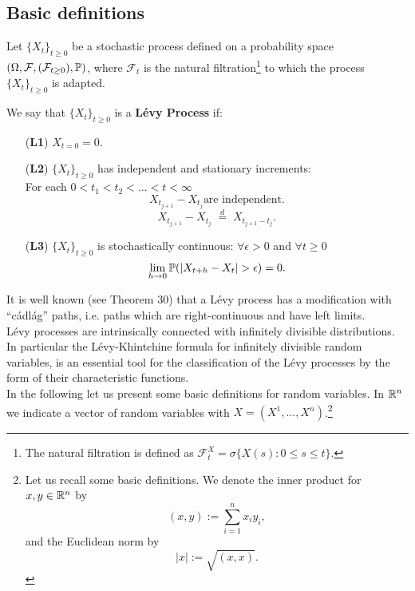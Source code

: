 \subsection{Basic definitions}

Let $\{X_t\}_{t \ge 0}$ be a stochastic process defined on a probability space $(\Omega,\mathcal{F},(\mathcal{F}_{t \ge 0}),\mathbb{P})$, 
where $\mathcal{F}_t$ is the natural filtration\footnote{The natural filtration is defined as $\mathcal{F}_{t}^X = \sigma\{X(s) :
0\leq s \leq t\} $.} to which the process $\{X_t\}_{t \ge 0}$ is adapted.\\ 
\begin{Definition}\label{LevyDef}
We say that $\{X_t\}_{t \ge 0}$ is a \textbf{Lévy Process} if:
\begin{itemize}
 \item[(\textbf{L1})] $X_{t=0} = 0$.
 \item[(\textbf{L2})] $\{X_t\}_{t \ge 0}$ has independent and stationary increments:\\ For each $0<t_1<t_2 <... <t<\infty$
   $$ X_{t_{j+1}} - X_{t_j} \mbox{are independent.} $$
   $$ X_{t_{j+1}} - X_{t_j} \; \overset{d}{=} \; X_{t_{j+1}- t_{j} }. $$ 
 \item[(\textbf{L3})] $\{X_t\}_{t \ge 0}$ is stochastically continuous: $\forall \epsilon > 0 $ and $\forall t \ge 0$  $$\lim_{h\to 0} \mathbb{P}(|X_{t+h}-X_t| > \epsilon)=0. $$ 
\end{itemize}
\end{Definition}
It is well known (see \cite{Protter} Theorem 30) that a Lévy process has a modification with ``cádlág''
paths, i.e. paths which are right-continuous and have left limits. \\
Lévy processes are intrinsically connected with infinitely divisible distributions. In particular the Lévy-Khintchine formula 
for infinitely divisible random variables, is an essential tool for the classification of the Lévy processes by the form of their
characteristic functions.\\
In the following let us present some basic definitions for random variables. In $\mathbb{R}^n$ we indicate a vector of random variables with $X = (X^1, ..., X^n)$.\footnote{ 
Let us recall some basic definitions. We denote the inner product for $x,y \in \mathbb{R}^n$ by
$$(x,y) := \sum_{i=1}^n x_i y_i ,$$ and the Euclidean norm by $$|x| := \sqrt{(x,x)}.$$ }

